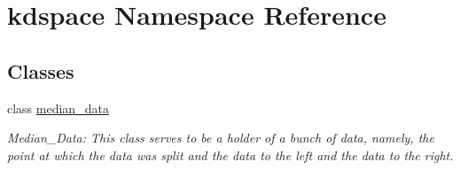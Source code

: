 \hypertarget{namespacekdspace}{}\section{kdspace Namespace Reference}
\label{namespacekdspace}
\subsection*{Classes}
\begin{DoxyCompactItemize}
\item 
class \hyperlink{classkdspace_1_1median__data}{median\+\_\+data}
\begin{DoxyCompactList}\small\item\em Median\+\_\+\+Data\+: This class serves to be a holder of a bunch of data, namely, the point at which the data was split and the data to the left and the data to the right. \end{DoxyCompactList}\end{DoxyCompactItemize}
